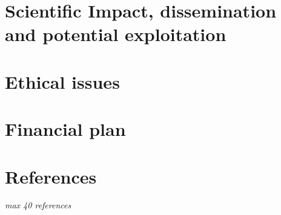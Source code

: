 \documentclass[11pt,twoside,a4paper]{article}
\begin{document}
\section{Scientific Impact, dissemination and potential exploitation}
\label{sec:scientific-impact}


\section{Ethical issues}
\label{sec:ethical-issues}


\section{Financial plan}
\label{sec:financial-plan}




\section{References}

\emph{max 40 references}
\end{document}
